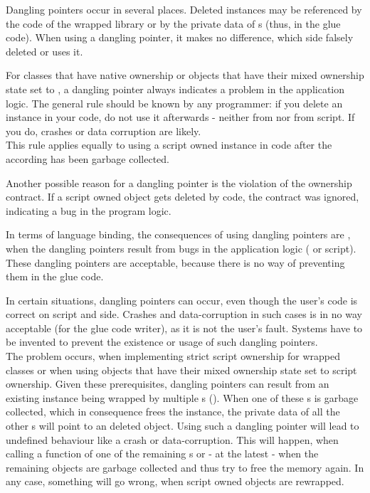Dangling pointers occur in several places. Deleted instances may be referenced by the  code of the wrapped library or by the private data of s (thus, in the glue code). When using a dangling pointer, it makes no difference, which side falsely deleted or uses it.

For classes that have native ownership or objects that have their mixed ownership state set to , a dangling pointer always indicates a problem in the application logic. The general rule should be known by any  programmer: if you delete an instance in your  code, do not use it afterwards - neither from  nor from script. If you do, crashes or data corruption are likely.\\
This rule applies equally to using a script owned instance in  code after the according  has been garbage collected.

Another possible reason for a dangling pointer is the violation of the ownership contract. If a script owned object gets deleted by  code, the contract was ignored, indicating a bug in the program logic.

In terms of language binding, the consequences of using dangling pointers are , when the dangling pointers result from bugs in the application logic ( or script). These dangling pointers are acceptable, because there is no way of preventing them in the glue code.

In certain situations, dangling pointers can occur, even though the user's code is correct on script and  side. Crashes and data-corruption in such cases is in no way acceptable (for the glue code writer), as it is not the user's fault. Systems have to be invented to prevent the existence or usage of such dangling pointers.\\
The problem occurs, when implementing strict script ownership for wrapped classes or when using objects that have their mixed ownership state set to script ownership. Given these prerequisites, dangling pointers can result from an existing  instance being wrapped by multiple s (). When one of these s is garbage collected, which in consequence frees the  instance, the private data of all the other s will point to an deleted object. Using such a dangling pointer will lead to undefined behaviour like a crash or data-corruption. This will happen, when calling a function of one of the remaining s or - at the latest - when the remaining objects are garbage collected and thus try to free the memory again. In any case, something will go wrong, when script owned objects are rewrapped.

